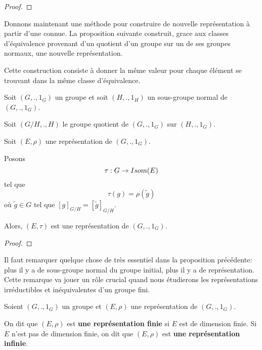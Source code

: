 \ifdefined\outputproof
\begin{proof}

\end{proof}
\fi

Donnons maintenant une méthode pour construire de nouvelle représentation à
partir d'une connue.
La proposition suivante construit, grace aux classes d'équivalence provenant
d'un quotient d'un groupe sur un de ses groupes normaux, une nouvelle
représentation.

Cette construction consiste à donner la même valeur pour chaque élément se
trouvant dans la même classe d'équivalence.

\begin{proposition}
	\label{prop:build_new_repr_with_equiv_class}
	Soit $(G, ., 1_{G})$ un groupe et soit $(H, ., 1_{H})$ un sous-groupe normal
	de $(G, ., 1_{G})$.

	Soit $(G/H, ., H)$ le groupe quotient de $(G, ., 1_{G})$ sur $(H, .,
	1_{G})$.

	Soit $(E, \rho)$ une représentation de $(G, ., 1_{G})$.

	Posons
	\begin{equation}
		\tau : G \rightarrow Isom(E)
	\end{equation}
	tel que
	\begin{equation}
		\tau(g) = \rho(\tilde{g})
	\end{equation}
	où $\tilde{g} \in G$ tel que $[g]_{G/H} = [\tilde{g}]_{G/H}$.

	Alors, $(E, \tau)$ est une représentation de $(G, .,
	1_{G})$.
\end{proposition}

\ifdefined\outputproof
\begin{proof}

\end{proof}
\fi

Il faut remarquer quelque chose de très essentiel dans la proposition
précédente: plus il y a de sous-groupe normal du groupe initial, plus il y a de
représentation. Cette remarque va jouer un rôle crucial quand nous étudierons
les représentations irréductibles et inéquivalentes d'un groupe fini.


\begin{definition} 
	Soient $(G, ., 1_{G})$ un groupe et $(E, \rho)$ une représentation de $(G, ., 1_{G})$.

	On dit que $(E, \rho)$ est \textbf{une représentation finie} si $E$ est de dimension finie.
	Si $E$ n'est pas de dimension finie, on dit que $(E, \rho)$ est \textbf{une
	représentation infinie}.
\end{definition}

